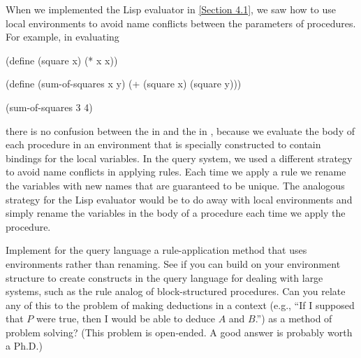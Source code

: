 \begin{exercise}
	\label{Exercise 4.79}
	When we implemented the Lisp evaluator in \cref{Section 4.1}, we saw how to use local environments to avoid name conflicts between the parameters of procedures.
	For example, in evaluating
	\begin{scheme}
	  (define (square x) (* x x))

	  (define (sum-of-squares x y)
	    (+ (square x) (square y)))

	  (sum-of-squares 3 4)
	\end{scheme}
	there is no confusion between the  in  and the  in , because we evaluate the body of each procedure in an environment that is specially constructed to contain bindings for the local variables.
	In the query system, we used a different strategy to avoid name conflicts in applying rules.
	Each time we apply a rule we rename the variables with new names that are guaranteed to be unique.
	The analogous strategy for the Lisp evaluator would be to do away with local environments and simply rename the variables in the body of a procedure each time we apply the procedure.

	Implement for the query language a rule-application method that uses environments rather than renaming.
	See if you can build on your environment structure to create constructs in the query language for dealing with large systems, such as the rule analog of block-structured procedures.
	Can you relate any of this to the problem of making deductions in a context (e.g., “If I supposed that \( P \) were true, then I would be able to deduce \( A \) and \( B \).”) as a method of problem solving?
	(This problem is open-ended.
	A good answer is probably worth a Ph.D.)
\end{exercise}
